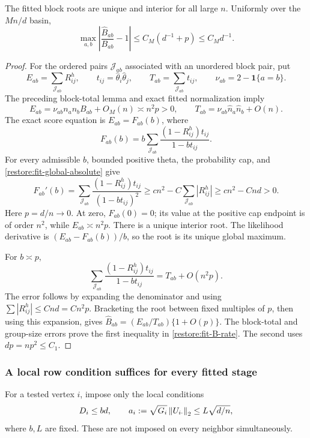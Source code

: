 \begin{lemma}
\label{restore:fit-block-root}
The fitted block roots are unique and interior for all large $n$.
Uniformly over the $Mn/d$ basin,
\begin{equation}\label{restore:fit-B-rate}
 \max_{a,b}\left|\frac{\widehat B_{ab}}{B_{ab}}-1\right|
       \le C_M(d^{-1}+p)\le C_Md^{-1}.
\end{equation}
\end{lemma}

\begin{proof}
For the ordered pairs $\mathcal J_{ab}$ associated with an unordered
block pair, put
\[
 E_{ab}=\sum_{\mathcal J_{ab}}R^h_{ij},\qquad
 t_{ij}=\widehat\theta_i\widehat\theta_j,\qquad
 T_{ab}=\sum_{\mathcal J_{ab}}t_{ij},\qquad
 \nu_{ab}=2-\mathbf1\{a=b\}.
\]
The preceding block-total lemma and exact fitted normalization imply
\[
 E_{ab}=\nu_{ab}n_an_bB_{ab}+O_M(n)\asymp n^2p>0,\qquad
 T_{ab}=\nu_{ab}\widehat n_a\widehat n_b+O(n).
\]
The exact score equation is $E_{ab}=F_{ab}(b)$, where
\[
 F_{ab}(b)=b\sum_{\mathcal J_{ab}}
              \frac{(1-R^h_{ij})t_{ij}}{1-bt_{ij}}.
\]
For every admissible $b$, bounded positive theta, the probability cap,
and \eqref{restore:fit-global-absolute} give
\[
 F_{ab}'(b)
 =\sum_{\mathcal J_{ab}}
          \frac{(1-R^h_{ij})t_{ij}}{(1-bt_{ij})^2}
 \ge cn^2-C\sum_{\mathcal J_{ab}}|R^h_{ij}|
 \ge cn^2-Cnd>0.
\]
Here $p=d/n\to0$. At zero, $F_{ab}(0)=0$; its value at the
positive cap endpoint is of order $n^2$, while $E_{ab}\asymp n^2p$.
There is a unique interior root. The likelihood derivative is
$(E_{ab}-F_{ab}(b))/b$, so the root is its unique global maximum.

For $b\asymp p$,
\[
 \sum_{\mathcal J_{ab}}
       \frac{(1-R^h_{ij})t_{ij}}{1-bt_{ij}}
       =T_{ab}+O(n^2p).
\]
The error follows by expanding the denominator and using
$\sum|R^h_{ij}|\le Cnd=Cn^2p$.
Bracketing the root between fixed multiples of $p$, then using this
expansion, gives
$\widehat B_{ab}=(E_{ab}/T_{ab})\{1+O(p)\}$.
The block-total and group-size errors prove the first inequality in
\eqref{restore:fit-B-rate}. The second uses $dp=np^2\le C_1$.
\end{proof}

\subsubsection{A local row condition suffices for every fitted stage}

For a tested vertex $i$, impose only the local conditions
\begin{equation}\label{restore:fit-local-row}
 D_i\le bd,\qquad
 a_i:=\sqrt{G_i}\left\lVert U_{i\cdot}\right\rVert_2\le L\sqrt{d/n},
\end{equation}
where $b,L$ are fixed. These are not imposed on every neighbor
simultaneously.

